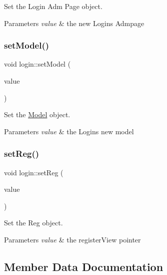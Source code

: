 Set the Login Adm Page object. 


\begin{DoxyParams}{Parameters}
{\em value} & the new Login\textquotesingle{}s Admpage \\
\hline
\end{DoxyParams}
\mbox{\label{classlogin_ae5f30c876e40c092ff18b88ea740d528}} 
\subsubsection{\texorpdfstring{set\+Model()}{setModel()}}
{\footnotesize\ttfamily void login\+::set\+Model (\begin{DoxyParamCaption}\item[{\hyperlink{classModel}{Model} $\ast$}]{value }\end{DoxyParamCaption})}



Set the \hyperlink{classModel}{Model} object. 


\begin{DoxyParams}{Parameters}
{\em value} & the Login\textquotesingle{}s new model \\
\hline
\end{DoxyParams}
\mbox{\label{classlogin_a139cc269e6d71c7f2650acff4cf1cd77}} 
\subsubsection{\texorpdfstring{set\+Reg()}{setReg()}}
{\footnotesize\ttfamily void login\+::set\+Reg (\begin{DoxyParamCaption}\item[{\hyperlink{classregisterview}{registerview} $\ast$}]{value }\end{DoxyParamCaption})}



Set the Reg object. 


\begin{DoxyParams}{Parameters}
{\em value} & the register\+View pointer \\
\hline
\end{DoxyParams}


\subsection{Member Data Documentation}
\mbox{\label{classlogin_ac0ba28b943ddc71777895e7144ac26a6}} 
